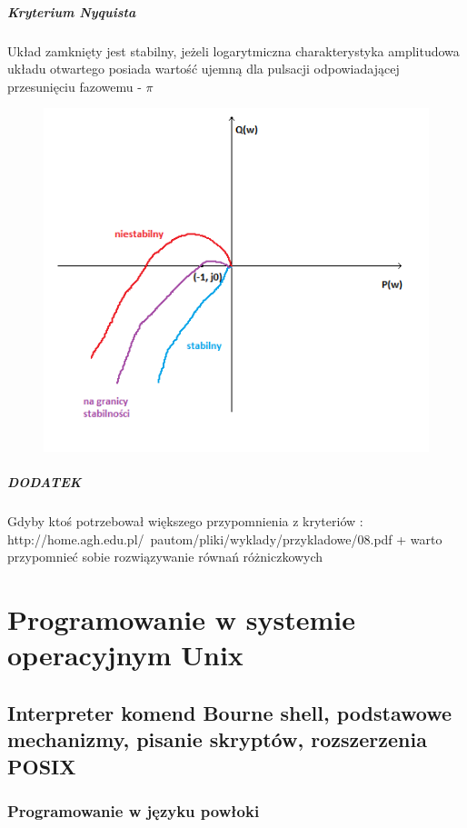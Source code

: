 \documentclass[a4paper,twoside]{report}
\begin{document}
\paragraph{Kryterium Nyquista}

Układ zamknięty jest stabilny, jeżeli logarytmiczna charakterystyka amplitudowa układu otwartego posiada wartość ujemną dla pulsacji odpowiadającej przesunięciu fazowemu - $\pi$
\begin{figure}[H]
	\includegraphics[scale=0.7]{obrazy/dynamiczne/Przyklad_nyquist.png}
\end{figure}
\paragraph{DODATEK}
Gdyby ktoś potrzebował większego przypomnienia z kryteriów : http://home.agh.edu.pl/~pautom/pliki/wyklady/przykladowe/08.pdf
+ warto przypomnieć sobie rozwiązywanie równań różniczkowych


\chapter{Programowanie w systemie operacyjnym Unix}
\section{Interpreter komend Bourne shell, podstawowe mechanizmy, pisanie skryptów, rozszerzenia POSIX }

\subsection{Programowanie w języku powłoki}
\end{document}
